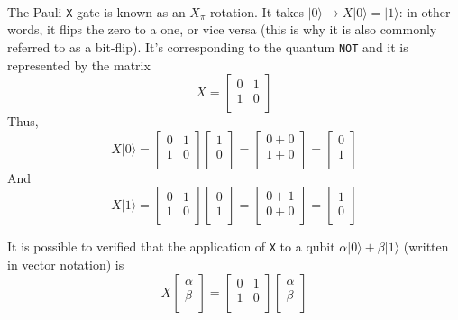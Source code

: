 \documentclass[a4paper,10pt]{article}
\begin{document}
\paragraph{} The Pauli \texttt{X} gate is known as an $X_{\pi}$-rotation. It takes $|0\rangle \rightarrow{} X|0\rangle = |1\rangle$: in other words, it flips the zero to a one, or vice versa (this is why it is also commonly referred to as a bit-flip). It's corresponding to the quantum \texttt{NOT} and it is represented by the matrix
$$X = \begin{bmatrix}
0 & 1 \\
1 & 0 \\
\end{bmatrix}$$
Thus,
$$X|0\rangle = \begin{bmatrix}
0 & 1 \\
1 & 0 \\
\end{bmatrix} \begin{bmatrix}
1 \\
0 \\
\end{bmatrix} = \begin{bmatrix}
0+0 \\
1+0 \\
\end{bmatrix} = \begin{bmatrix}
0 \\
1 \\
\end{bmatrix}$$
And
$$X|1\rangle = \begin{bmatrix}
0 & 1 \\
1 & 0 \\
\end{bmatrix} \begin{bmatrix}
0 \\
1 \\
\end{bmatrix} = \begin{bmatrix}
0+1 \\
0+0 \\
\end{bmatrix} = \begin{bmatrix}
1 \\
0 \\
\end{bmatrix}$$

It is possible to verified that the application of \texttt{X} to a qubit $\alpha|0\rangle + \beta|1\rangle$ (written in vector notation) is
$$X\begin{bmatrix}
\alpha \\
\beta \\
\end{bmatrix} = \begin{bmatrix}
0 & 1 \\
1 & 0 \\
\end{bmatrix} \begin{bmatrix}
\alpha \\
\beta \\
\end{bmatrix}$$
\end{document}
